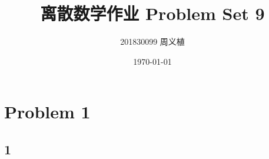 \documentclass{article}
\title{离散数学作业 Problem Set 9}
\author{201830099 周义植}
\date{\today}
\begin{document}
\maketitle
\section*{Problem 1}
\subsection*{1}
\end{document}
